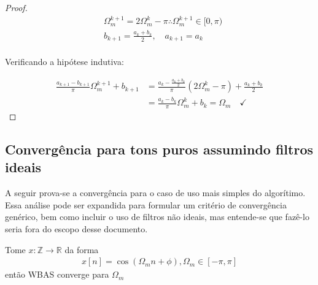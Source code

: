 \begin{lemma}
\begin{proof}
    \begin{align*}
        &\Omega_m^{k+1} = 2\Omega_m^k - \pi \therefore \Omega_m^{k+1} \in [0,\pi)\\
        &b_{k+1} = \frac{a_k+b_k}{2},\quad a_{k+1}=a_k\\
    \end{align*}

    Verificando a hipótese indutiva:

    \begin{align*}
        \frac{a_{k+1}-b_{k+1}}{\pi}\Omega_m^{k+1}+b_{k+1}
        &= \frac{a_k-\frac{a_k+b_k}{2}}{\pi}(2\Omega_m^{k}-\pi)+\frac{a_k+b_k}{2}\\ 
        &= \frac{a_k-b_{k}}{\pi}\Omega_m^{k}+b_k = \Omega_m \quad\checkmark
    \end{align*}
    
\end{proof}
\end{lemma}

\subsection{Convergência para tons puros assumindo filtros ideais}

A seguir prova-se a convergência para o caso de uso mais simples do algorítimo. Essa análise pode ser expandida para formular um critério de convergência genérico, bem como incluir  o uso de filtros não ideais, mas entende-se que fazê-lo seria fora do escopo desse documento.

\begin{thm}
Tome $x:\mathbb{Z}\to\mathbb{R}$ da forma
\begin{align*}
    x[n] = \cos(\Omega_m n + \phi), \Omega_m \in [-\pi,\pi]
\end{align*}
então \ac{WBAS} converge para $\Omega_m$
\end{thm}

